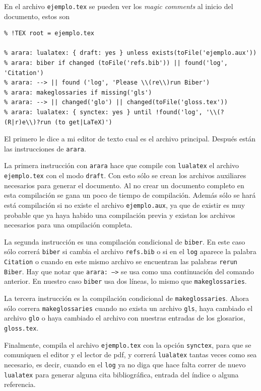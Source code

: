 En el archivo \texttt{ejemplo.tex} se pueden ver los \textit{magic comments} al inicio del documento, estos son
\begin{verbatim}
% !TEX root = ejemplo.tex

% arara: lualatex: { draft: yes } unless exists(toFile('ejemplo.aux'))
% arara: biber if changed (toFile('refs.bib')) || found('log', 'Citation')
% arara: --> || found ('log', 'Please \\(re\\)run Biber')
% arara: makeglossaries if missing('gls')
% arara: --> || changed('glo') || changed(toFile('gloss.tex'))
% arara: lualatex: { synctex: yes } until !found('log', '\\(?(R|r)e\\)?run (to get|LaTeX)')
\end{verbatim}
El primero le dice a mi editor de texto cual es el archivo principal. Después
están las instrucciones de \texttt{arara}.

La primera instrucción con \texttt{arara} hace que compile con
\texttt{lualatex} el archivo \texttt{ejemplo.tex} con el modo \texttt{draft}.
Con esto sólo se crean los archivos auxiliares necesarios para generar el
documento. Al no crear un documento completo en esta compilación se gana un
poco de tiempo de compilación. Además sólo se hará está compilación si no
existe el archivo \texttt{ejemplo.aux}, ya que de existir es muy probable que
ya haya habido una compilación previa y existan los archivos necesarios para
una ompilación completa.

La segunda instrucción es una compilación condicional de \texttt{biber}. En
este caso sólo correrá \texttt{biber} si cambia el archivo \texttt{refs.bib} o
si en el \texttt{log} aparece la palabra \texttt{Citation} o cuando en este
mismo archivo se encuentran las palabras \texttt{rerun Biber}. Hay que notar
que \texttt{arara: -->} se usa como una continuación del comando anterior. En
nuestro caso \texttt{biber} usa dos líneas, lo mismo que
\texttt{makeglossaries}.

La tercera instrucción es la compilación condicional de
\texttt{makeglossaries}. Ahora sólo correra \texttt{makeglossaries} cuando no
exista un archivo \texttt{gls}, haya cambiado el archivo \texttt{glo} o haya
cambiado el archivo con nuestras entradas de los glosarios, \texttt{gloss.tex}.

Finalmente, compila el archivo \texttt{ejemplo.tex} con la opción \texttt{synctex}, para que se comuniquen el editor y el lector de pdf, y correrá \texttt{lualatex} tantas veces como sea necesario, es decir, cuando en el \texttt{log} ya no diga que hace falta correr de nuevo \texttt{lualatex} para generar alguna cita bibliográfica, entrada del índice o alguna referencia.

